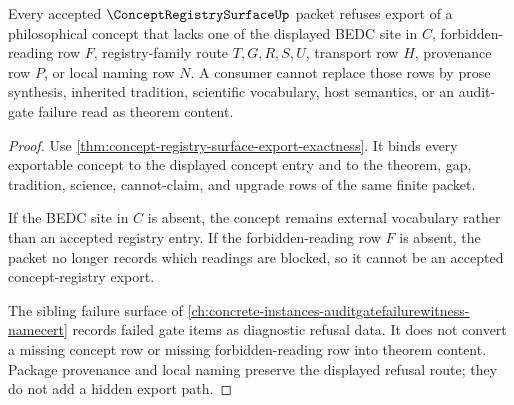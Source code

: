 \begin{theorem}
\label{thm:concept-registry-surface-forbidden-reading-refusal}
Every accepted $\ConceptRegistrySurfaceUp$ packet refuses export of a philosophical concept that lacks one of the displayed BEDC site in $C$, forbidden-reading row $F$, registry-family route $T,G,R,S,U$, transport row $H$, provenance row $P$, or local naming row $N$. A consumer cannot replace those rows by prose synthesis, inherited tradition, scientific vocabulary, host semantics, or an audit-gate failure read as theorem content.
\end{theorem}
\begin{proof}
Use \autoref{thm:concept-registry-surface-export-exactness}. It binds every exportable concept to the displayed concept entry and to the theorem, gap, tradition, science, cannot-claim, and upgrade rows of the same finite packet.

If the BEDC site in $C$ is absent, the concept remains external vocabulary rather than an accepted registry entry. If the forbidden-reading row $F$ is absent, the packet no longer records which readings are blocked, so it cannot be an accepted concept-registry export.

The sibling failure surface of \autoref{ch:concrete-instances-auditgatefailurewitness-namecert} records failed gate items as diagnostic refusal data. It does not convert a missing concept row or missing forbidden-reading row into theorem content. Package provenance and local naming preserve the displayed refusal route; they do not add a hidden export path.
\end{proof}

